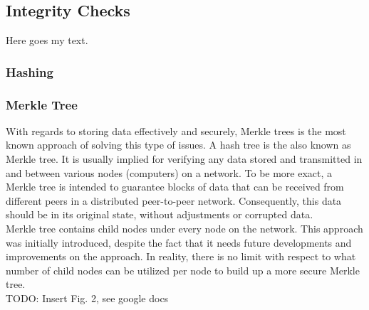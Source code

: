 \subsection{Integrity Checks}

Here goes my text.

\subsubsection{Hashing}
\subsubsection{Merkle Tree}

With regards to storing data effectively and securely, Merkle trees is the most known approach of solving this type of issues. A hash tree is the also known as Merkle tree. It is usually implied for verifying any data stored and transmitted in and between various nodes (computers) on a network. To be more exact, a Merkle tree is intended to guarantee blocks of data that can be received from different peers in a distributed peer-to-peer network. Consequently, this data should be in its original state, without adjustments or corrupted data.\\
Merkle tree contains child nodes under every node on the network. This approach was initially introduced, despite the fact that it needs future developments and improvements on the approach. In reality, there is no limit with respect to what number of child nodes can be utilized per node to build up a more secure Merkle tree.\\
TODO: Insert Fig. 2, see google docs
